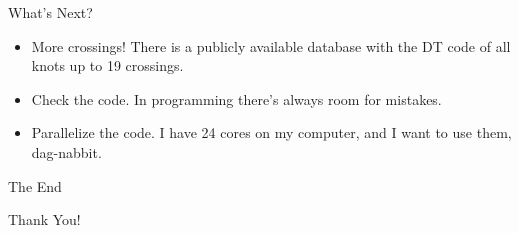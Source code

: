 \documentclass{beamer}
\begin{document}
    \begin{frame}{What's Next?}
        \begin{itemize}
            \item More crossings! There is a publicly available database with
                the DT code of all knots up to 19 crossings.
            \item Check the code. In programming there's always room for
                mistakes.
            \item Parallelize the code. I have 24 cores on my computer, and I
                want to use them, dag-nabbit.
        \end{itemize}
    \end{frame}
    \begin{frame}{The End}
        \begin{center}
            Thank You!
        \end{center}
    \end{frame}
\end{document}
